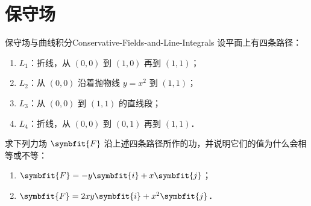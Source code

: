 \section{保守场}

\begin{problem}{保守场与曲线积分}{Conservative-Fields-and-Line-Integrals}
    设平面上有四条路径：
    \begin{enumerate}
        \item $L_1$：折线，从 $(0,0)$ 到 $(1,0)$ 再到 $(1,1)$；
        \item $L_2$：从 $(0,0)$ 沿着抛物线 $y = x^2$ 到 $(1,1)$；
        \item $L_3$：从 $(0,0)$ 到 $(1,1)$ 的直线段；
        \item $L_4$：折线，从 $(0,0)$ 到 $(0,1)$ 再到 $(1,1)$．
    \end{enumerate}
    求下列力场 $\symbfit{F}$ 沿上述四条路径所作的功，并说明它们的值为什么会相等或不等：
    \begin{enumerate}
        \item $\symbfit{F} = -y \symbfit{i} + x \symbfit{j}$；
        \item $\symbfit{F} = 2xy \symbfit{i} + x^2 \symbfit{j}$．
    \end{enumerate}
\end{problem}

